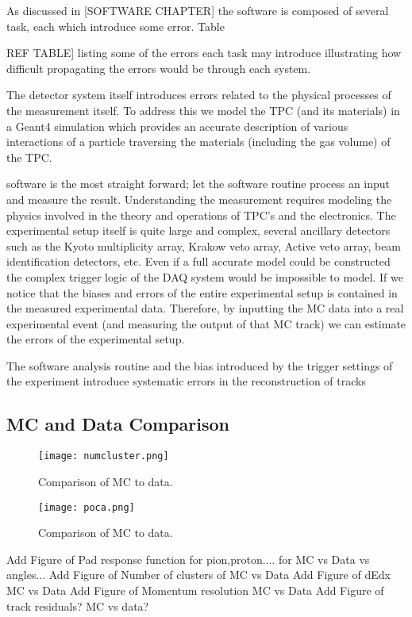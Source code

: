 As discussed in [SOFTWARE CHAPTER] the software is composed of several task, each which introduce some error. Table {REF TABLE] listing some of the errors each task may introduce illustrating how difficult propagating the errors would be through each system. 

The detector system itself introduces errors related to the physical processes of the measurement itself. To address this we model the TPC (and its materials) in a Geant4 simulation which provides an accurate description of various interactions of a particle traversing the materials (including the gas volume) of the TPC. 


 software is the most straight forward; let the software routine process an input and measure the result. Understanding the measurement requires modeling the physics involved in the theory and operations of TPC's and the  electronics. The experimental setup itself is quite large and complex, several ancillary detectors such as the Kyoto multiplicity array, Krakow veto array, Active veto array, beam identification detectors, etc. Even if a full accurate model could be constructed the complex trigger logic of the DAQ system would be impossible to model. If we notice that the biases and errors of the entire experimental setup is contained in the measured experimental data. Therefore, by inputting the MC data into a real experimental event (and measuring the output of that MC track) we can estimate the errors of the experimental setup. 

The software analysis routine and the bias introduced by the trigger settings of the experiment introduce systematic errors in the reconstruction of tracks

\subsection{MC and Data Comparison}

\begin{figure}[!hbt]
\texttt{[image: numcluster.png]}
\caption{Comparison of MC to data.}
\label{fig:clustcomp}
\end{figure}


\begin{figure}[!hbt]
\texttt{[image: poca.png]}
\caption{Comparison of MC to data.}
\label{fig:pocacomp}
\end{figure}


Add Figure of Pad response function for pion,proton.... for MC vs Data vs angles...
Add Figure of Number of clusters of MC vs Data
Add Figure of dEdx MC vs Data
Add Figure of Momentum resolution MC vs Data
Add Figure of track residuals? MC vs data?


}
